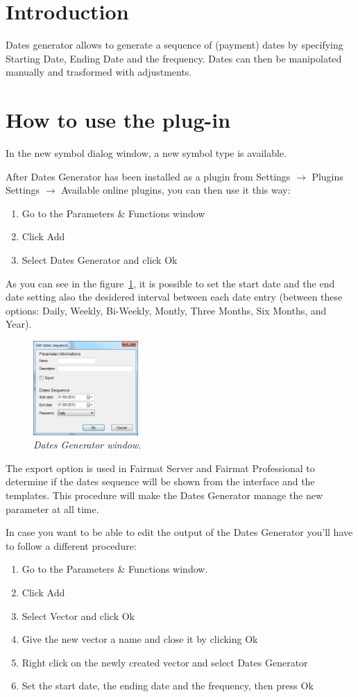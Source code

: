 \newcommand{\pluginName}{Dates Generator}
\newcommand{\pluginVersion}{1.0}




\section{Introduction}
Dates generator allows to generate a sequence of (payment) dates by specifying Starting Date, Ending Date and the frequency.  Dates can then be manipolated manually and trasformed with adjustments.
\section{How to use the plug-in}
In the new symbol dialog window, a new symbol type is available.

After Dates Generator has been installed as a plugin from Settings $\to$ Plugins Settings 
$\to$ Available online plugins, you can then use it this way: 
\begin{enumerate}
\item Go to the Parameters \& Functions window
\item Click Add
\item Select Dates Generator and click Ok
\end{enumerate}
As you can see in the figure~\ref{fig:DG}, it is possible to set the start date and the end date setting also the desidered interval between each date entry (between these options: Daily, Weekly, Bi-Weekly, Montly, Three Months, Six Months, and Year).
\begin{figure}[h!]
\includegraphics[width=4cm]{DG_img}
\centering
\caption{\small{\emph{Dates Generator window.}}}
\label{fig:DG}
\end{figure}
The export option is used in Fairmat Server and Fairmat Professional to determine if the dates sequence will be shown from the interface and the templates. This procedure will make the Dates Generator manage the new parameter at all time. 

In case you want to be able to edit the output of the Dates Generator you'll have to follow a different procedure:
\begin{enumerate}
\item Go to the Parameters \& Functions window.
\item Click Add
\item Select Vector and click Ok
\item Give the new vector a name and close it by clicking Ok
\item Right click on the newly created vector and select Dates Generator
\item Set the start date, the ending date and the frequency, then press Ok
\end{enumerate}

